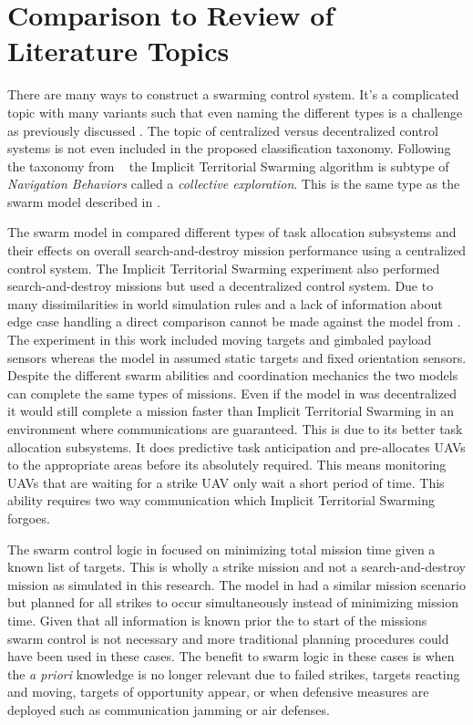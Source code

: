 \section{Comparison to Review of Literature Topics}
There are many ways to construct a swarming control system.  It's a complicated topic with many variants such that even naming the different types is a challenge as previously discussed \parencite{iridia}. The topic of centralized versus decentralized control systems is not even included in the proposed classification taxonomy. Following the taxonomy from ~\textcite{iridia} the Implicit Territorial Swarming algorithm is subtype of \textit{Navigation Behaviors} called a \textit{collective exploration}.  This is the same type as the swarm model described in \textcite{jin}.

The swarm model in \textcite{jin} compared different types of task allocation subsystems and their effects on overall search-and-destroy mission performance using a centralized control system.  The Implicit Territorial Swarming experiment also performed search-and-destroy missions but used a decentralized control system.  Due to many dissimilarities in world simulation rules and a lack of information about edge case handling a direct comparison cannot be made against the model from \textcite{jin}.  The experiment in this work included moving targets and gimbaled payload sensors whereas the model in \textcite{jin} assumed static targets and fixed orientation sensors.  Despite the different swarm abilities and coordination mechanics the two models can complete the same types of missions.  Even if the model in \textcite{jin} was decentralized it would still complete a mission faster than Implicit Territorial Swarming in an environment where communications are guaranteed.  This is due to its better task allocation subsystems.  It does predictive task anticipation and pre-allocates UAVs to the appropriate areas before its absolutely required.  This means monitoring UAVs that are waiting for a strike UAV only wait a short period of time.  This ability requires two way communication which Implicit Territorial Swarming forgoes.

The swarm control logic in \textcite{bellingham} focused on minimizing total mission time given a known list of targets.  This is wholly a strike mission and not a search-and-destroy mission as simulated in this research.  The model in \textcite{beard} had a similar mission scenario but planned for all strikes to occur simultaneously instead of minimizing mission time.  Given that all information is known prior the to start of the missions swarm control is not necessary and more traditional planning procedures could have been used in these cases.  The benefit to swarm logic in these cases is when the \textit{a priori} knowledge is no longer relevant due to failed strikes, targets reacting and moving, targets of opportunity appear, or when defensive measures are deployed such as communication jamming or air defenses.

